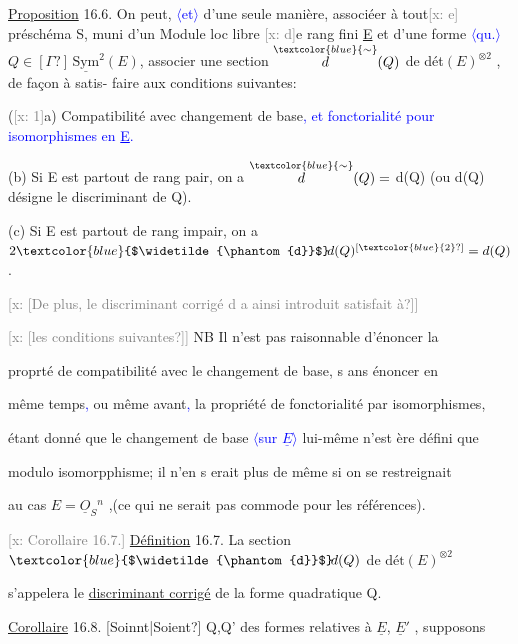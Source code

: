 \documentclass[11pt]{article}
\newcommand{\scanpage}[1]{\par\bigskip\noindent{\small\sffamily[scan #1]}\par}
\newcommand{\mspage}[1]{{\small\sffamily[p.\,#1]}}
\newcommand{\hand}[1]{\textcolor{blue}{#1}}
\let\over\relax
\newcommand{\over}[2]{\textcolor{gray}{#1}\textcolor{blue}{\ensuremath{^{\!\nearrow}}#2}}
\newcommand{\inserted}[2][]{\textcolor{blue}{$\langle$#2$\rangle$}}
\newcommand{\xout}[1]{\textcolor{gray}{[\textsf{x:} #1]}}
\newcommand{\uline}[1]{\underline{#1}}
\newcommand{\unsure}[1]{[#1?]}
\newcommand{\illegible}[1]{[\textsf{illeg.\ #1}]}
\begin{document}
\uline{Proposition} 16.6. On peut, \inserted{et} d'une seule manière, associéer à tout\xout{e}
préschéma S, muni d'un Module loc libre \xout{d}e rang fini \uline{E} et d'une forme \inserted{qu.}
$Q \in \unsure{\Gamma}\,\underline{\mathrm{Sym}}^2(E)$, associer une section $\overset{\hand{\sim}}{d}(Q)$ de dét$(E)^{\otimes 2}$ , de façon à satis-%
faire aux conditions suivantes:

(\xout{1}a) Compatibilité avec changement de base\hand{, et fonctorialité pour isomorphismes en \uline{E}.}

(b) Si E est partout de rang pair, on a $\overset{\hand{\sim}}{d}(Q) =$ d(Q) (ou d(Q)
désigne le discriminant de Q).

\mspage{\hand{176}}

\clearpage
\scanpage{25/177}
\mspage{\hand{4}}

(c) Si E est partout de rang impair, on a $2\hand{$\widetilde{\phantom{d}}$}\!d(Q)^{\unsure{\hand{2}}} = d(Q)$.

\xout{\unsure{De plus, le discriminant corrigé d a ainsi introduit satisfait à}}

\xout{\unsure{les conditions suivantes}} \quad NB Il n'est pas raisonnable d'énoncer la

propr\over{\illegible{1}}{\unsure{ié}}té de compatibilité avec le changement de base, s ans énoncer en

même temps\hand{,} ou même avant\hand{,} la propriété de fonctorialité par isomorphismes,

étant donné que le changement de base \inserted{sur $\underline{E}$} lui-même n'est \over{p}{g}ère défini que

modulo isomorpphisme; il n'en s erait plus de même si on se restreignait

au cas $E = \underline{O}_S{}^n$ ,(ce qui ne serait pas commode pour les références).

\xout{Corollaire 16.7.} \quad \uline{Définition} 16.7. La section $\hand{$\widetilde{\phantom{d}}$}\!d(Q)$ de $\text{dét}(E)^{\otimes 2}$

s'appelera le \uline{discriminant corrigé} de la forme quadratique Q.

\uline{Corollaire} 16.8. \unsure{Soinnt|Soient} Q,Q' des formes relatives à $\underline{E}$, $\underline{E}'$ , supposons
\end{document}
